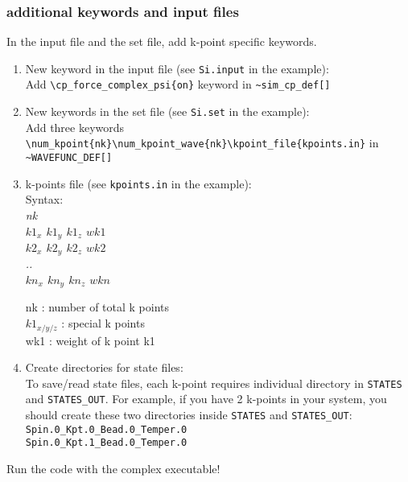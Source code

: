 \subsubsection{additional keywords and input files}
In the input file and the set file, add k-point specific keywords. 
\begin{enumerate}

\item New keyword in the input file (see \verb+Si.input+ in the example): \\
Add \verb+\cp_force_complex_psi{on}+ keyword in \verb+~sim_cp_def[]+

\item New keywords in the set file (see \verb+Si.set+ in the example): \\
Add three keywords \verb+\num_kpoint{nk}\num_kpoint_wave{nk}\kpoint_file{kpoints.in}+ in \verb+~WAVEFUNC_DEF[]+

\item k-points file (see \verb+kpoints.in+ in the example):\\
Syntax: \\
{\it
nk \\
$k1_x$ $k1_y$ $k1_z$ $wk1$ \\
$k2_x$ $k2_y$ $k2_z$ $wk2$ \\
.. \\
$kn_x$ $kn_y$ $kn_z$ $wkn$ \\
}

nk : number of total k points\\
$k1_{x/y/z}$ : special k points\\
wk1 : weight of k point k1\\

\item Create directories for state files: \\
To save/read state files, each k-point requires individual directory in \verb+STATES+ and \verb+STATES_OUT+. For example, if you have 2 k-points in your system, you should create these two directories inside \verb+STATES+ and \verb+STATES_OUT+: \\
\verb+Spin.0_Kpt.0_Bead.0_Temper.0+\\
\verb+Spin.0_Kpt.1_Bead.0_Temper.0+


\end{enumerate}


Run the code with the complex executable!



%